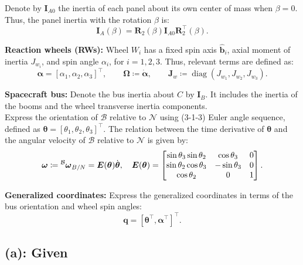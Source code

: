 \documentclass[titlepage]{article}
\newcommand{\diag}{\operatorname{diag}}
\begin{document}
Denote by $\boldsymbol{I}_{A0}$ the inertia of each panel about its own center of mass when $\beta=0$. Thus, the panel inertia with the rotation $\beta$ is:
\begin{equation}
	\boldsymbol{I}_A(\beta)=\boldsymbol{R}_2(\beta)\boldsymbol{I}_{A0}\boldsymbol{R}_2^\top(\beta).
	\label{eq:IA}
\end{equation}

\textbf{Reaction wheels (RWs):} Wheel $W_i$ has a fixed spin axis $\hat{\boldsymbol{b}}_i$, axial moment of inertia $J_{w_i}$, and spin angle $\alpha_i$, for $i=1,2,3$. Thus, relevant terms are defined as:
\begin{equation}
	\boldsymbol{\alpha}=[\alpha_1,\alpha_2,\alpha_3]^\top,\qquad\boldsymbol{\Omega}\coloneqq\dot{\boldsymbol{\alpha}},\qquad\boldsymbol{J}_w\coloneqq\diag(J_{w_1},J_{w_2},J_{w_3}).
	\label{eq:rw}
\end{equation}

\textbf{Spacecraft bus:} Denote the bus inertia about $C$ by $\boldsymbol{I}_B$. It includes the inertia of the booms and the wheel transverse inertia components.\\

Express the orientation of $\mathcal{B}$ relative to $\mathcal{N}$ using (3-1-3) Euler angle sequence, defined as $\boldsymbol{\theta}=[\theta_1,\theta_2,\theta_3]^\top$. The relation between the time derivative of $\boldsymbol{\theta}$ and the angular velocity of $\mathcal{B}$ relative to $\mathcal{N}$ is given by:
\begin{equation}
	\boldsymbol{\omega}\coloneqq\prescript{\mathcal{B}}{}{\boldsymbol{\omega}}_{B/N}=\boldsymbol{E}(\boldsymbol{\theta})\dot{\boldsymbol{\theta}},\quad\boldsymbol{E}(\boldsymbol{\theta})=
	\begin{bmatrix}
		\sin\theta_3\sin\theta_2 & \cos\theta_3 & 0 \\
		\sin\theta_2\cos\theta_3 & -\sin\theta_3 & 0 \\
		\cos\theta_2 & 0 & 1
	\end{bmatrix}.
	\label{eq:E}
\end{equation}

\textbf{Generalized coordinates:} Express the generalized coordinates in terms of the bus orientation and wheel spin angles:
\begin{equation}
	\boldsymbol{q}=[\boldsymbol{\theta}^\top,\boldsymbol{\alpha}^\top]^\top.
	\label{eq:gencoord}
\end{equation}

\subsection*{(a): Given}
\end{document}
